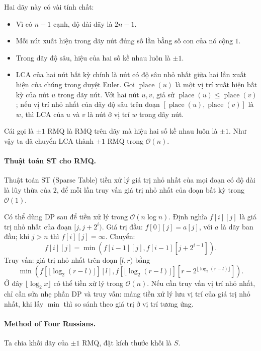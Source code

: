 \documentclass[11pt]{article}
\newcommand{\Oh}{\mathcal{O}}
\begin{document}
Hai dãy này có vài tính chất:
\begin{itemize}
  \item Vì có \(n-1\) cạnh, độ dài dãy là \(2n-1\).
  \item Mỗi nút xuất hiện trong dãy nút đúng số lần bằng số con của nó cộng
  \(1\).
  \item Trong dãy độ sâu, hiệu của hai số kề nhau luôn là \(\pm1\).
  \item LCA của hai nút bất kỳ chính là nút có độ sâu nhỏ nhất giữa hai lần
  xuất hiện của chúng trong duyệt Euler. Gọi \(\operatorname{place}(u)\) là
  một vị trí xuất hiện bất kỳ của nút \(u\) trong dãy nút. Với hai nút \(u,v\),
  giả sử \(\operatorname{place}(u)\le \operatorname{place}(v)\); nếu vị trí
  nhỏ nhất của dãy độ sâu trên đoạn
  \([\operatorname{place}(u),\operatorname{place}(v)]\) là \(w\), thì LCA của
  \(u\) và \(v\) là nút ở vị trí \(w\) trong dãy nút.
\end{itemize}

Cái gọi là \(\pm1\) RMQ là RMQ trên dãy mà hiệu hai số kề nhau luôn là
\(\pm1\). Như vậy ta đã chuyển LCA thành \(\pm1\) RMQ trong \(\Oh(n)\).

\paragraph{Thuật toán ST cho RMQ.}
Thuật toán ST (Sparse Table) tiền xử lý giá trị nhỏ nhất của mọi đoạn có độ
dài là lũy thừa của \(2\), để mỗi lần truy vấn giá trị nhỏ nhất của đoạn bất
kỳ trong \(\Oh(1)\).

Có thể dùng DP sau để tiền xử lý trong \(\Oh(n\log n)\). Định nghĩa
\(f[i][j]\) là giá trị nhỏ nhất của đoạn \([j,j+2^i)\). Giá trị đầu:
\(f[0][j]=a[j]\), với \(a\) là dãy ban đầu; khi \(j>n\) thì
\(f[i][j]=\infty\). Chuyển:
\[
  f[i][j]=\min\left(f[i-1][j],f[i-1][j+2^{i-1}]\right).
\]
Truy vấn: giá trị nhỏ nhất trên đoạn \([l,r)\) bằng
\[
\min\left(
f[\lfloor\log_2(r-l)\rfloor][l],
f[\lfloor\log_2(r-l)\rfloor][r-2^{\lfloor\log_2(r-l)\rfloor}]
\right).
\]
Ở đây \(\lfloor\log_2 x\rfloor\) có thể tiền xử lý trong \(\Oh(n)\). Nếu cần
truy vấn vị trí nhỏ nhất, chỉ cần sửa nhẹ phần DP và truy vấn: mảng tiền xử lý
lưu vị trí của giá trị nhỏ nhất, khi lấy \(\min\) thì so sánh theo giá trị ở
vị trí tương ứng.

\paragraph{Method of Four Russians.}
Ta chia khối dãy của \(\pm1\) RMQ, đặt kích thước khối là \(S\).
\end{document}
